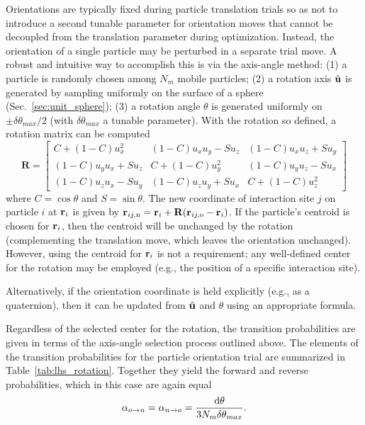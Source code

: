 Orientations are typically fixed during particle translation trials so as not to introduce a second tunable parameter for orientation moves that cannot be decoupled from the translation parameter during optimization.
Instead, the orientation of a single particle may be perturbed in a separate trial move.
A robust and intuitive way to accomplish this is via the axis-angle method: (1) a particle is randomly chosen among $N_m$ mobile particles; (2) a rotation axis $\hat {\bf u}$ is generated by sampling uniformly on the surface of a sphere (Sec.~\ref{sec:unit_sphere}); (3) a rotation angle $\theta$ is generated uniformly on $\pm\delta\theta_{max}/2$ (with $\delta\theta_{max}$ a tunable parameter).
With the rotation so defined, a rotation matrix can be computed
\begin{equation}
\mathbf{R} =
\begin{bmatrix}
C + (1 - C) u_x^2 & (1 - C) u_x u_y - S u_z & (1 - C) u_x u_z + S u_y \\
(1 - C) u_y u_x + S u_z & C + (1 - C) u_y^2 & (1 - C) u_y u_z - S u_x \\
(1 - C) u_z u_x - S u_y & (1 - C) u_z u_y + S u_x & C + (1 - C) u_z^2
\end{bmatrix}
\label{eq:rotation_matrix}
\end{equation}
where $C =\cos\theta$ and $S = \sin\theta$.
The new coordinate of interaction site $j$ on particle $i$ at ${\bf r}_i$ is given by ${{\bf r}_{ij,{\rm n}}={\bf r}_{i}}+{\mathbf R}({\bf r}_{ij,{\rm o}}-{\bf r}_i)$.
If the particle's centroid is chosen for ${\bf r}_i$, then the centroid will be unchanged by the rotation (complementing the translation move, which leaves the orientation unchanged).
However, using the centroid for ${\bf r}_i$ is not a requirement; any well-defined center for the rotation may be employed (e.g., the position of a specific interaction site).

Alternatively, if the orientation coordinate is held explicitly (e.g., as a quaternion), then it can be updated from $\hat{\bf u}$ and $\theta$ using an appropriate formula.

Regardless of the selected center for the rotation, the transition probabilities are given in terms of the axis-angle selection process outlined above.
The elements of the transition probabilities for the particle orientation trial are summarized in Table~\ref{tab:lhs_rotation}.
Together they yield the forward and reverse probabilities, which in this case are again equal
\begin{equation}
  \alpha_{o\rightarrow n}=\alpha_{n\rightarrow o} = \frac{\mathop{}\!\mathrm{d}\theta}{3 N_m \delta\theta_{max}}.
\label{eq:lhs_rhs_rot_fwdrev}
\end{equation}

